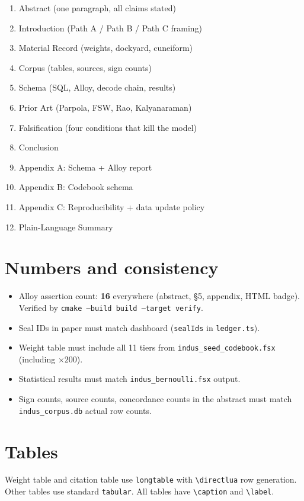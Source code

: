 \documentclass[11pt]{article}
\begin{document}
\begin{enumerate}[nosep]
\item Abstract (one paragraph, all claims stated)
\item Introduction (Path A / Path B / Path C framing)
\item Material Record (weights, dockyard, cuneiform)
\item Corpus (tables, sources, sign counts)
\item Schema (SQL, Alloy, decode chain, results)
\item Prior Art (Parpola, FSW, Rao, Kalyanaraman)
\item Falsification (four conditions that kill the model)
\item Conclusion
\item Appendix A: Schema + Alloy report
\item Appendix B: Codebook schema
\item Appendix C: Reproducibility + data update policy
\item Plain-Language Summary
\end{enumerate}

\section{Numbers and consistency}

\begin{itemize}[nosep]
\item Alloy assertion count: \textbf{16} everywhere (abstract,
  \S5, appendix, HTML badge). Verified by
  \texttt{cmake --build build --target verify}.
\item Seal IDs in paper must match dashboard
  (\texttt{sealIds} in \texttt{ledger.ts}).
\item Weight table must include all 11 tiers from
  \texttt{indus\_seed\_codebook.fsx} (including $\times200$).
\item Statistical results must match
  \texttt{indus\_bernoulli.fsx} output.
\item Sign counts, source counts, concordance counts in the
  abstract must match \texttt{indus\_corpus.db} actual row
  counts.
\end{itemize}

\section{Tables}

Weight table and citation table use \texttt{longtable} with
\texttt{\textbackslash directlua} row generation.
Other tables use standard \texttt{tabular}.
All tables have \texttt{\textbackslash caption} and
\texttt{\textbackslash label}.
\end{document}
